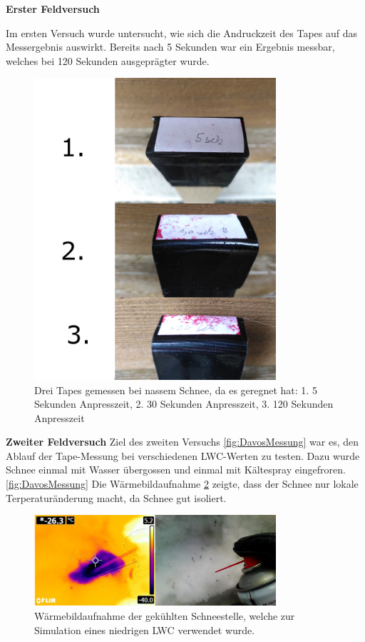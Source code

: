 


\textbf{Erster Feldversuch}
\label{ersterFeldVer}

Im ersten Versuch wurde untersucht, wie sich die Andruckzeit des Tapes auf das Messergebnis auswirkt. Bereits nach 5 Sekunden war ein Ergebnis messbar, welches bei 120 Sekunden ausgeprägter wurde.

\begin{figure}[H]
    \centering
    \includegraphics[width=0.8\textwidth]{Bilder/ZeitAbha.png}
    \caption{Drei Tapes gemessen bei nassem Schnee, da es geregnet hat: 1. 5 Sekunden Anpresszeit, 2. 30 Sekunden Anpresszeit, 3. 120 Sekunden Anpresszeit} 
    \label{fig:ZeitDruck}
\end{figure}

\newpage
\textbf{Zweiter Feldversuch}
\label{zweitFeldVer}
Ziel des zweiten Versuchs \ref{fig:DavosMessung} war es, den Ablauf der Tape-Messung bei verschiedenen LWC-Werten zu testen. Dazu wurde Schnee einmal mit Wasser übergossen und einmal mit Kältespray eingefroren. \ref{fig:DavosMessung} Die Wärmebildaufnahme \ref{fig:KaltSchnee} zeigte, dass der Schnee nur lokale Terperaturänderung macht, da Schnee gut isoliert. 

\begin{figure}[H]
    \centering
    \includegraphics[width=0.8\textwidth]{Bilder/KalterSchnee.png}
    \caption{Wärmebildaufnahme der gekühlten Schneestelle, welche zur Simulation eines niedrigen LWC verwendet wurde.} 
    \label{fig:KaltSchnee}
\end{figure}



